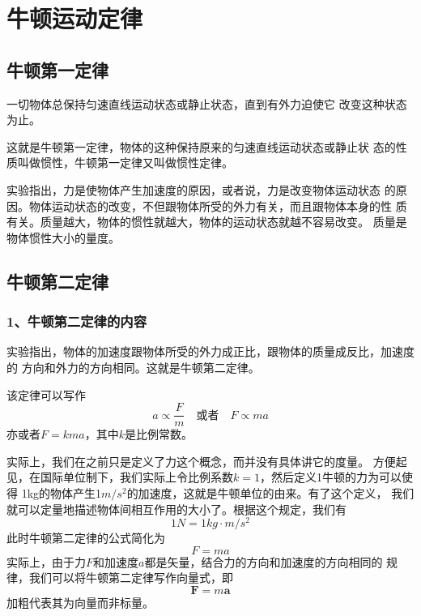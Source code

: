 \section{牛顿运动定律}
\subsection{牛顿第一定律}
\begin{definition}
    一切物体总保持匀速直线运动状态或静止状态，直到有外力迫使它
    改变这种状态为止。
\end{definition}

这就是牛顿第一定律，物体的这种保持原来的匀速直线运动状态或静止状
态的性质叫做惯性，牛顿第一定律又叫做惯性定律。

实验指出，力是使物体产生加速度的原因，或者说，力是改变物体运动状态
的原因。物体运动状态的改变，不但跟物体所受的外力有关，而且跟物体本身的性
质有关。质量越大，物体的惯性就越大，物体的运动状态就越不容易改变。
质量是物体惯性大小的量度。
\subsection{牛顿第二定律}
\subsubsection*{1、牛顿第二定律的内容}
\begin{definition}
    实验指出，物体的加速度跟物体所受的外力成正比，跟物体的质量成反比，加速度的
    方向和外力的方向相同。这就是牛顿第二定律。
\end{definition}

该定律可以写作
\begin{equation}
    a\propto \frac{F}{m}\quad\text{或者}\quad F\propto ma
\end{equation}
亦或者$F=kma$，其中$k$是比例常数。

实际上，我们在之前只是定义了力这个概念，而并没有具体讲它的度量。
方便起见，在国际单位制下，我们实际上令比例系数$k=1$，然后定义1牛顿的力为可以使得
1kg的物体产生1$m/s^2$的加速度，这就是牛顿单位的由来。有了这个定义，
我们就可以定量地描述物体间相互作用的大小了。根据这个规定，我们有 
\begin{equation}
    1N=1kg\cdot m/s^2
\end{equation}
此时牛顿第二定律的公式简化为 
\begin{equation}
    F=ma
\end{equation}
实际上，由于力$F$和加速度$a$都是矢量，结合力的方向和加速度的方向相同的
规律，我们可以将牛顿第二定律写作向量式，即 
\begin{equation}
    \boldsymbol{F}=m\boldsymbol{a}
\end{equation}
加粗代表其为向量而非标量。

